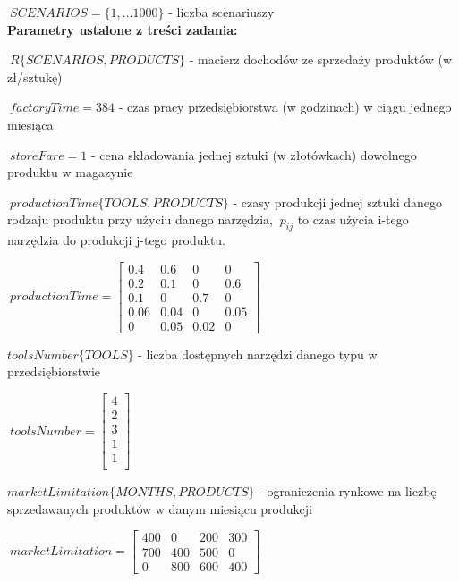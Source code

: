 \documentclass[11pt]{article} %
\begin{document}
$\ SCENARIOS  = \{1, ... 1000 \} $ - liczba scenariuszy
\leavevmode \\

\textbf{Parametry ustalone z treści zadania:}

$\ R\{SCENARIOS, PRODUCTS\} $ - macierz dochodów ze sprzedaży produktów (w zł/sztukę)

$\ factoryTime = 384 $  - czas pracy przedsiębiorstwa (w godzinach) w ciągu jednego miesiąca 

$\ storeFare = 1 $ - cena składowania jednej sztuki (w złotówkach) dowolnego produktu w magazynie

$\ productionTime\{TOOLS, PRODUCTS\} $ - czasy produkcji jednej sztuki danego rodzaju produktu przy użyciu danego narzędzia,
$\ p_{ij} $ to czas użycia i-tego narzędzia do produkcji j-tego produktu.  

\begin{center}
$\ productionTime = 
\begin{bmatrix}
0.4 & 0.6 & 0 &0 \\ 
0.2 & 0.1 & 0  & 0.6\\ 
 0.1& 0 & 0.7 & 0 \\ 
 0.06& 0.04 & 0 & 0.05 \\ 
 0& 0.05 & 0.02  & 0
\end{bmatrix}$
\end{center}

$ toolsNumber\{TOOLS\} $ - liczba dostępnych narzędzi danego typu w przedsiębiorstwie

\begin{center}
$\ toolsNumber = 
\begin{bmatrix}
4 \\
2 \\
3 \\
1 \\
1 \\
\end{bmatrix}$
\end{center}

$ marketLimitation\{MONTHS, PRODUCTS\} $ - ograniczenia rynkowe na liczbę sprzedawanych produktów w danym miesiącu produkcji

\begin{center}
$\ marketLimitation = 
\begin{bmatrix}
400 & 0 & 200 & 300 \\ 
700 & 400 & 500 & 0 \\
0 & 800 & 600 & 400
\end{bmatrix}$
\end{center}
\leavevmode \\
\end{document}
